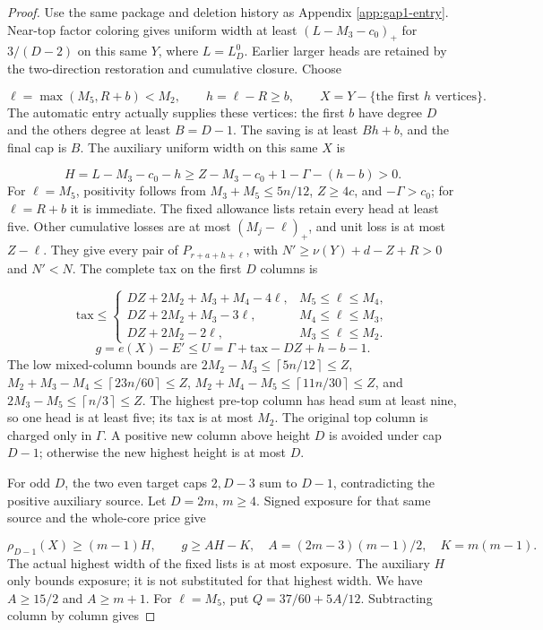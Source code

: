 \documentclass[11pt,a4paper]{article}
\newcommand{\ceil}[1]{\left\lceil#1\right\rceil}
\theoremstyle{definition}
\begin{document}
\begin{proof}
Use the same package and deletion history as Appendix \ref{app:gap1-entry}.
Near-top factor coloring gives uniform width at least $(L-M_3-c_0)_+$
for $3/(D-2)$ on this same $Y$, where $L=L_D^0$.
Earlier larger heads are retained by the two-direction restoration and cumulative closure.
Choose

\[
\ell=\max(M_5,R+b)<M_2,\qquad h=\ell-R\ge b,\qquad
X=Y-\{\text{the first }h\text{ vertices}\}.
\]
The automatic entry actually supplies these vertices:
the first $b$ have degree $D$ and the others degree at least $B=D-1$.
The saving is at least $Bh+b$, and the final cap is $B$.
The auxiliary uniform width on this same $X$ is

\[
H=L-M_3-c_0-h
\ge Z-M_3-c_0+1-\Gamma-(h-b)>0.
\]
For $\ell=M_5$, positivity follows from
$M_3+M_5\le5n/12$, $Z\ge4c$, and $-\Gamma>c_0$;
for $\ell=R+b$ it is immediate.
The fixed allowance lists retain every head at least five.
Other cumulative losses are at most $(M_j-\ell)_+$, and unit loss is at most $Z-\ell$.
They give every pair of $P_{r+a+h+\ell}$,
with $N'\ge\nu(Y)+d-Z+R>0$ and $N'<N$.
The complete tax on the first $D$ columns is

\[
\mathrm{tax}\le
\begin{cases}
DZ+2M_2+M_3+M_4-4\ell,&M_5\le\ell\le M_4,\\
DZ+2M_2+M_3-3\ell,&M_4\le\ell\le M_3,\\
DZ+2M_2-2\ell,&M_3\le\ell\le M_2.
\end{cases}
\]
\[
g=e(X)-E'\le U=\Gamma+\mathrm{tax}-DZ+h-b-1.
\]
The low mixed-column bounds are
$2M_2-M_3\le\ceil{5n/12}\le Z$,
$M_2+M_3-M_4\le\ceil{23n/60}\le Z$,
$M_2+M_4-M_5\le\ceil{11n/30}\le Z$, and
$2M_3-M_5\le\ceil{n/3}\le Z$.
The highest pre-top column has head sum at least nine, so one head is at least five;
its tax is at most $M_2$.
The original top column is charged only in $\Gamma$.
A positive new column above height $D$ is avoided under cap $D-1$;
otherwise the new highest height is at most $D$.

For odd $D$, the two even target caps $2,D-3$ sum to $D-1$,
contradicting the positive auxiliary source.
Let $D=2m$, $m\ge4$. Signed exposure for that same source and the whole-core price give

\[
\rho_{D-1}(X)\ge(m-1)H,\qquad
g\ge AH-K,\quad A=(2m-3)(m-1)/2,\quad K=m(m-1).
\]
The actual highest width of the fixed lists is at most exposure.
The auxiliary $H$ only bounds exposure; it is not substituted for that highest width.
We have $A\ge15/2$ and $A\ge m+1$.
For $\ell=M_5$, put $Q=37/60+5A/12$. Subtracting column by column gives


\end{proof}
\end{document}
